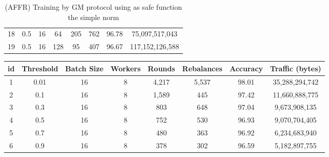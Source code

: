 \begin{table}[H]
\begin{tabular}{|c|c|c|c|c|c|c|c|}
        18                     & 0.5                   & 16                    & 64                    & 205                   & 762                   & 96.78                 & 75,097,517,043           \\
        19                     & 0.5                   & 16                    & 128                   & 95                    & 407                   & 96.67                 & 117,152,126,588          \\
        \hline
    \end{tabular}
    \caption{(AFFR) Training by GM protocol using as safe function the simple norm}
    \label{tab:table-gm-sf1-nlp-exp}
\end{table}

\newpage

\begin{table}[H]
    \begin{tabular}{|c|c|c|c|c|c|c|c|}
        \hline
        \textbf{id}            & \textbf{Threshold}    & \textbf{Batch Size}   & \textbf{Workers}      & \textbf{Rounds}       & \textbf{Rebalances}   & \textbf{Accuracy}     & \textbf{Traffic (bytes)} \\
        \hline
        1                      & 0.01                  & 16                    & 8                     & 4,217                 & 5,537                 & 98.01                 & 35,288,294,742           \\
        2                      & 0.1                   & 16                    & 8                     & 1,589                 & 445                   & 97.42                 & 11,660,888,775           \\
        3                      & 0.3                   & 16                    & 8                     & 803                   & 648                   & 97.04                 & 9,673,908,135            \\
        4                      & 0.5                   & 16                    & 8                     & 752                   & 530                   & 96.93                 & 9,070,704,405            \\
        5                      & 0.7                   & 16                    & 8                     & 480                   & 363                   & 96.92                 & 6,234,683,940            \\
        6                      & 0.9                   & 16                    & 8                     & 378                   & 302                   & 96.59                 & 5,182,897,755            \\

\end{tabular}
\end{table}
